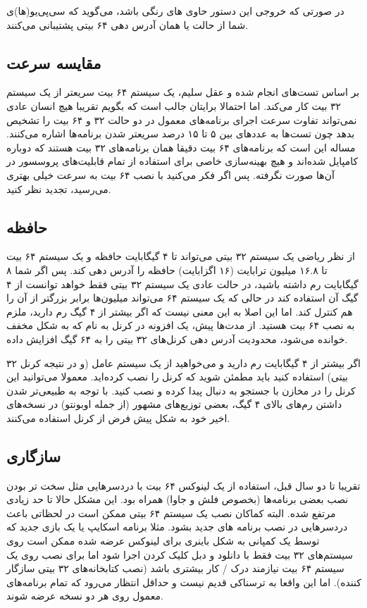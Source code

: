 
در صورتی که خروجی این دستور حاوی 
های رنگی باشد، می‌گوید که سی‌پی‌یو(ها)ی شما از حالت 
یا همان آدرس دهی ۶۴ بیتی پشتیبانی می‌کنند.

\subsection*{مقایسه سرعت}
بر اساس تست‌های انجام شده و عقل سلیم، یک سیستم ۶۴ بیت سریعتر از یک سیستم ۳۲ بیت کار می‌کند. اما احتمالا برایتان جالب است که بگویم تقریبا هیچ انسان عادی نمی‌تواند تفاوت سرعت اجرای برنامه‌های معمول در دو حالت ۳۲ و ۶۴ بیت را تشخیص بدهد چون تست‌ها به عددهای بین ۵ تا ۱۵ درصد سریعتر شدن برنامه‌ها اشاره می‌کنند. مساله این است که برنامه‌های ۶۴ بیت دقیقا همان برنامه‌های ۳۲ بیت هستند که دوباره کامپایل شده‌اند و هیچ بهینه‌سازی خاصی برای استفاده از تمام قابلیت‌های پروسسور در آن‌ها صورت نگرفته. پس اگر فکر می‌کنید با نصب ۶۴ بیت به سرعت خیلی بهتری می‌رسید، تجدید نظر کنید.
\subsection*{حافظه}
از نظر ریاضی یک سیستم ۳۲ بیتی می‌تواند تا ۴ گیگابایت حافظه و یک سیستم ۶۴ بیت تا ۱۶.۸ میلیون ترابایت (۱۶ اگزابایت) حافظه را آدرس دهی کند. پس اگر شما ۸ گیگابایت رم داشته باشید، در حالت عادی یک سیستم ۳۲ بیتی فقط خواهد توانست از ۴ گیگ آن استفاده کند در حالی که یک سیستم ۶۴ می‌تواند میلیون‌ها برابر بزرگتر از آن‌ را هم کنترل کند. اما این اصلا به این معنی نیست که اگر بیشتر از ۴ گیگ رم دارید، ملزم به نصب ۶۴ بیت هستید. از مدت‌ها پیش، یک افزونه در کرنل به نام 
 که به شکل مخفف 
 خوانده می‌شود، محدودیت آدرس دهی کرنل‌های ۳۲ بیتی را به ۶۴ گیگ افزایش داده.
 
اگر بیشتر از ۴ گیگابایت رم دارید و می‌خواهید از یک سیستم عامل (و در نتیجه کرنل ۳۲ بیتی) استفاده کنید باید مطمئن شوید که کرنل 
 را نصب کرده‌اید. معمولا می‌توانید این کرنل را در مخازن با جستجو به دنبال 
 پیدا کرده و نصب کنید. با توجه به طبیعی‌تر شدن داشتن رم‌های بالای ۴ گیگ، بعضی توزیع‌های مشهور (از جمله اوبونتو) در نسخه‌های اخیر خود به شکل پیش فرض از کرنل 
 استفاده می‌کنند.
\subsection*{سازگاری}
تقریبا تا دو سال قبل، استفاده از یک لینوکس ۶۴ بیت با دردسرهایی مثل سخت تر بودن نصب بعضی برنامه‌ها (بخصوص فلش و جاوا) همراه بود. این مشکل حالا تا حد زیادی مرتفع شده. البته کماکان نصب یک سیستم ۶۴ بیتی ممکن است در لحظاتی باعث دردسرهایی در نصب برنامه های جدید بشود. مثلا برنامه اسکایپ یا یک بازی جدید که توسط یک کمپانی به شکل باینری برای لینوکس عرضه شده ممکن است روی سیستم‌های ۳۲ بیت فقط با دانلود و دبل کلیک کردن اجرا شود اما برای نصب روی یک سیستم ۶۴ بیت نیازمند درک / کار بیشتری باشد (نصب کتابخانه‌های ۳۲ بیتی سازگار کننده). اما این واقعا به ترسناکی قدیم نیست و حداقل انتظار می‌رود که تمام برنامه‌های معمول روی هر دو نسخه عرضه شوند.


